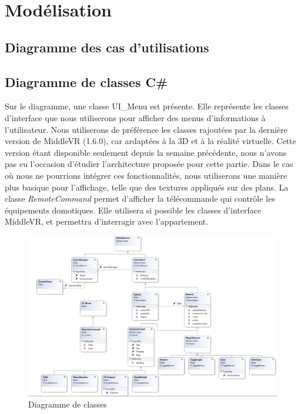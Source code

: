 \section{Modélisation}

\subsection{Diagramme des cas d’utilisations}


\subsection{Diagramme de classes C\#}

Sur le diagramme, une classe UI\_Menu est présente. Elle représente les classes d'interface que nous utiliserons pour afficher des menus d'informations à l'utilisateur.
Nous utiliserons de préférence les classes rajoutées par la dernière version de MiddleVR (1.6.0), car ardaptées à la 3D et à la réalité virtuelle.
Cette version étant disponible seulement depuis la semaine précédente, nous n'avons pas eu l'occasion d'étudier l'architecture proposée pour cette partie.
Dans le cas où nous ne pourrions intégrer ces fonctionnalités, nous utiliserons une manière plus basique pour l'affichage, telle que des textures appliqués sur des plans.
\newline
La classe \textit{RemoteCommand} permet d'afficher la télécommande qui contrôle les équipements domotiques. 
Elle utilisera si possible les classes d'interface MiddleVR, et permettra d'interragir avec l'appartement.

\begin{figure}[p]
    \centering
    \includegraphics[width=\textwidth]{4-Conception/img/diagClasses.png}
    \caption{Diagramme de classes}
    \label{fig:class_diagram}
\end{figure}
 
